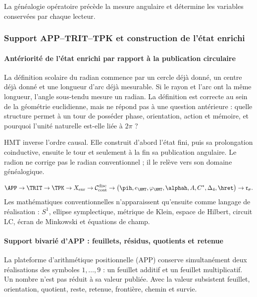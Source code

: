 \noindent La généalogie opératoire précède la mesure angulaire et détermine les variables conservées par chaque lecteur.\par\medskip

\subsubsection{Support APP--TRIT--TPK et construction de l'état enrichi}

\paragraph{Antériorité de l'état enrichi par rapport à la publication circulaire}

La définition scolaire du radian commence par un cercle déjà donné, un centre déjà
donné et une longueur d'arc déjà mesurable. Si le rayon et l'arc ont la
même longueur, l'angle sous-tendu mesure un radian. La définition est correcte
au sein de la géométrie euclidienne, mais ne répond pas à une question antérieure :
quelle structure permet à un tour de posséder phase, orientation, action et
mémoire, et pourquoi l'unité naturelle est-elle liée à \(2\pi\) ?

HMT inverse l'ordre causal. Elle construit d'abord l'état fini, puis sa
prolongation coinductive, ensuite le tour et seulement à la fin sa publication
angulaire. Le radion ne corrige pas le radian conventionnel ; il le relève vers son domaine
généalogique.

\begin{typebox}
\[
\APP\to\TRIT\to\TPK\to X_{\mathrm{enr}}
\to\mathcal C^{\mathrm{disc}}_{\mathrm{cont}}
\to\bigl(\pih,e_{\HMT},\varphi_{\HMT},\alphah,A,C^*,\Delta_4,\hret\bigr)
\to\mathfrak r_\sigma.
\]
Les mathématiques conventionnelles n'apparaissent qu'ensuite comme langage de réalisation :
\(S^1\), ellipse symplectique, métrique de Klein, espace de Hilbert, circuit
LC, écran de Minkowski et équations de champ.
\end{typebox}

\paragraph{Support bivarié d'APP : feuillets, résidus, quotients et retenue}

La plateforme d'arithmétique positionnelle (APP) conserve simultanément deux
réalisations des symboles \(1,\dots,9\) : un feuillet additif et un feuillet
multiplicatif. Un nombre n'est pas réduit à sa valeur publiée. Avec la valeur
subsistent feuillet, orientation, quotient, reste, retenue, frontière, chemin et
survie.

